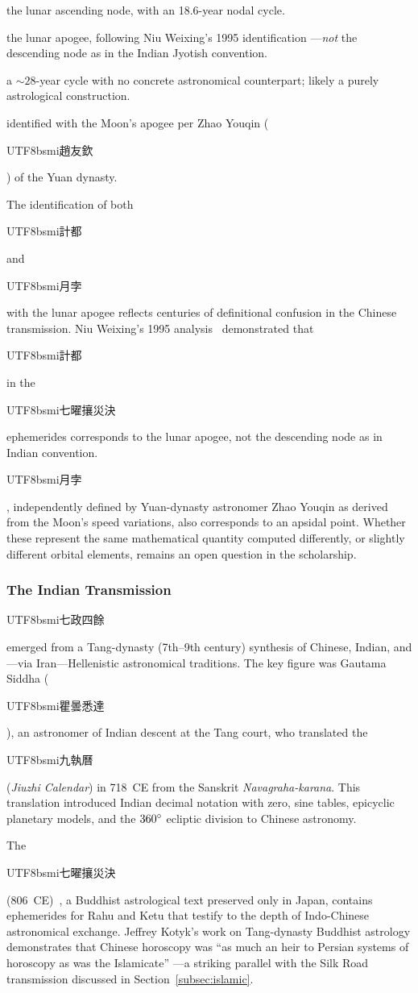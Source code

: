 \documentclass[10pt,a4paper]{article}
\newcommand{\zh}[1]{\begin{CJK}{UTF8}{bsmi}#1\end{CJK}}
\begin{document}
\begin{description}[leftmargin=0pt, labelindent=0pt, nosep]
  \item[\zh{羅喉} (Rahu):] the lunar ascending node, with an 18.6-year
    nodal cycle.
  \item[\zh{計都} (Ketu):] the lunar apogee, following Niu Weixing's 1995
    identification \cite{niu_weixing_1995}---\emph{not} the descending
    node as in the Indian Jyotish convention.
  \item[\zh{紫氣} (Purple Qi):] a ${\sim}28$-year cycle with no concrete
    astronomical counterpart; likely a purely astrological construction.
  \item[\zh{月孛} (Lunar Apogee):] identified with the Moon's apogee per
    Zhao Youqin (\zh{趙友欽}) of the Yuan dynasty.
\end{description}

\noindent
The identification of both \zh{計都} and \zh{月孛} with the lunar apogee
reflects centuries of definitional confusion in the Chinese transmission.
Niu Weixing's 1995 analysis~\cite{niu_weixing_1995} demonstrated that
\zh{計都} in the \zh{七曜攘災決} ephemerides corresponds to the lunar
apogee, not the descending node as in Indian convention. \zh{月孛},
independently defined by Yuan-dynasty astronomer Zhao Youqin as derived
from the Moon's speed variations, also corresponds to an apsidal point.
Whether these represent the same mathematical quantity computed
differently, or slightly different orbital elements, remains an open
question in the scholarship.

\subsubsection{The Indian Transmission}

\zh{七政四餘} emerged from a Tang-dynasty (7th--9th century) synthesis
of Chinese, Indian, and---via Iran---Hellenistic astronomical traditions.
The key figure was Gautama Siddha (\zh{瞿曇悉達}), an astronomer of
Indian descent at the Tang court, who translated the \zh{九執曆}
(\textit{Jiuzhi Calendar}) in 718~CE from the Sanskrit
\textit{Navagraha-karana}. This translation introduced Indian decimal
notation with zero, sine tables, epicyclic planetary models, and the
$360\degree$ ecliptic division to Chinese astronomy.

The \zh{七曜攘災決} (806~CE)~\cite{qiyao_rangzai}, a Buddhist astrological
text preserved only in Japan, contains ephemerides for Rahu and Ketu that
testify to the depth of Indo-Chinese astronomical exchange. Jeffrey Kotyk's work
on Tang-dynasty Buddhist astrology demonstrates that Chinese horoscopy was
``as much an heir to Persian systems of horoscopy as was the
Islamicate'' \cite{kotyk_2017, kotyk_2018}---a striking parallel with the
Silk Road transmission discussed in Section~\ref{subsec:islamic}.
\end{document}
